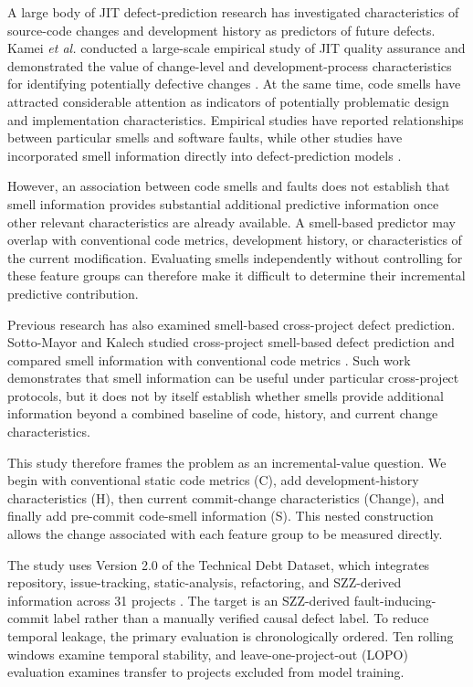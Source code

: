 \documentclass[conference]{IEEEtran}
\begin{document}
A large body of JIT defect-prediction research has investigated characteristics of source-code changes and development history as predictors of future defects. Kamei \textit{et al.} conducted a large-scale empirical study of JIT quality assurance and demonstrated the value of change-level and development-process characteristics for identifying potentially defective changes \cite{kamei2013jit}. At the same time, code smells have attracted considerable attention as indicators of potentially problematic design and implementation characteristics. Empirical studies have reported relationships between particular smells and software faults, while other studies have incorporated smell information directly into defect-prediction models \cite{hall2014smells,palomba2016teen,palomba2019smellaware}.

However, an association between code smells and faults does not establish that smell information provides substantial additional predictive information once other relevant characteristics are already available. A smell-based predictor may overlap with conventional code metrics, development history, or characteristics of the current modification. Evaluating smells independently without controlling for these feature groups can therefore make it difficult to determine their incremental predictive contribution.

Previous research has also examined smell-based cross-project defect prediction. Sotto-Mayor and Kalech studied cross-project smell-based defect prediction and compared smell information with conventional code metrics \cite{sottomayor2021cross}. Such work demonstrates that smell information can be useful under particular cross-project protocols, but it does not by itself establish whether smells provide additional information beyond a combined baseline of code, history, and current change characteristics.

This study therefore frames the problem as an incremental-value question. We begin with conventional static code metrics (C), add development-history characteristics (H), then current commit-change characteristics (Change), and finally add pre-commit code-smell information (S). This nested construction allows the change associated with each feature group to be measured directly.

The study uses Version 2.0 of the Technical Debt Dataset, which integrates repository, issue-tracking, static-analysis, refactoring, and SZZ-derived information across 31 projects \cite{lenarduzzi2019technical}. The target is an SZZ-derived fault-inducing-commit label rather than a manually verified causal defect label. To reduce temporal leakage, the primary evaluation is chronologically ordered. Ten rolling windows examine temporal stability, and leave-one-project-out (LOPO) evaluation examines transfer to projects excluded from model training.
\end{document}
